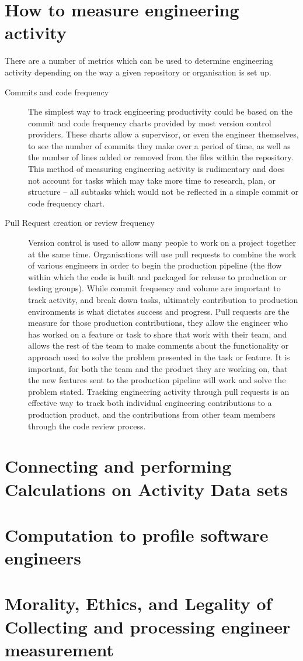 \documentclass{article}
\begin{document}
    \section{How to measure engineering activity}
        There are a number of metrics which can be used to determine engineering activity depending on the way a given repository or organisation is set up. 
        \begin{description}
            \item[Commits and code frequency] The simplest way to track engineering productivity could be based on the commit and code frequency charts provided by most version control providers. These charts allow a supervisor, or even the engineer themselves, to see the number of commits they make over a period of time, as well as the number of lines added or removed from the files within the repository. This method of measuring engineering activity is rudimentary and does not account for tasks which may take more time to research, plan, or structure -- all subtasks which would not be reflected in a simple commit or code frequency chart. 
            \item[Pull Request creation or review frequency] Version control is used to allow many people to work on a project together at the same time. Organisations will use pull requests to combine the work of various engineers in order to begin the production pipeline (the flow within which the code is built and packaged for release to production or testing groups). While commit frequency and volume are important to track activity, and break down tasks, ultimately contribution to production environments is what dictates success and progress. Pull requests are the measure for those production contributions, they allow the engineer who has worked on a feature or task to share that work with their team, and allows the rest of the team to make comments about the functionality or approach used to solve the problem presented in the task or feature. It is important, for both the team and the product they are working on, that the new features sent to the production pipeline will work and solve the problem stated. Tracking engineering activity through pull requests is an effective way to track both individual engineering contributions to a production product, and the contributions from other team members through the code review process. 
            \item[] 
        \end{description}
    \section{Connecting and performing Calculations on Activity Data sets}
    \section{Computation to profile software engineers}
    \section{Morality, Ethics, and Legality of Collecting and processing engineer measurement}
    
    
\end{document}
